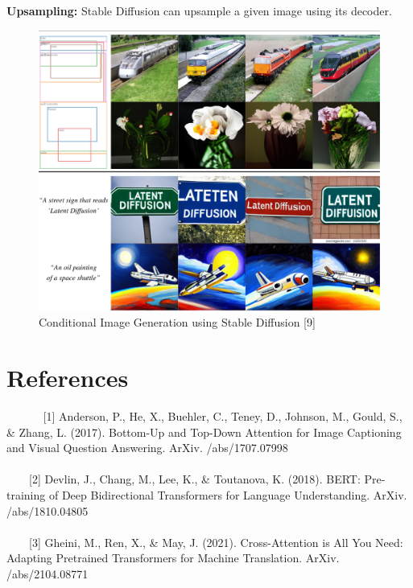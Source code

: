 \documentclass{article}
\begin{document}
\item \textbf{Upsampling:} Stable Diffusion can upsample a given image using its decoder.

\begin{figure} [H]
    \centering
    \includegraphics[width=0.92\linewidth]{stable_diffusion_prompts.png}
    \caption{Conditional Image Generation using Stable Diffusion [9]}
    \label{fig:enter-label}
\end{figure}
\newpage
\section{References}
$\hspace{35pt}$ [1] Anderson, P., He, X., Buehler, C., Teney, D., Johnson, M., Gould, S., \& Zhang, L. (2017). Bottom-Up and Top-Down Attention for Image Captioning and Visual Question Answering. ArXiv. /abs/1707.07998 \\ \\

$\hspace{20pt}$ [2] Devlin, J., Chang, M., Lee, K., \& Toutanova, K. (2018). BERT: Pre-training of Deep Bidirectional Transformers for Language Understanding. ArXiv. /abs/1810.04805 \\ \\

$\hspace{20pt}$ [3] Gheini, M., Ren, X., \& May, J. (2021). Cross-Attention is All You Need: Adapting Pretrained Transformers for Machine Translation. ArXiv. /abs/2104.08771 \\ \\
\end{document}
